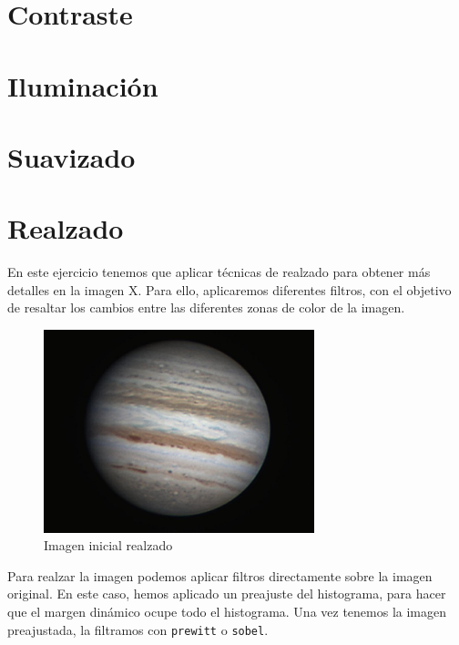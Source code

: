 \documentclass[12pt]{article}
\begin{document}
	\pagebreak
	
	\section{Contraste}
	
	\pagebreak
	
	\section{Iluminación}
	
	\pagebreak
	
	\section{Suavizado}
	
	\pagebreak
	
	\section{Realzado}
	
	\noindent En este ejercicio tenemos que aplicar técnicas de realzado para obtener más detalles en la imagen X. Para ello, aplicaremos diferentes filtros, con el objetivo de resaltar los cambios entre las diferentes zonas de color de la imagen.
	
	\begin{figure}[h]
		\begin{center}
			\includegraphics[width=0.7\textwidth]{img/realzado.jpg}
			\caption{Imagen inicial realzado}
			\label{img: realzado src}
		\end{center}
	\end{figure}

	\noindent Para realzar la imagen podemos aplicar filtros directamente sobre la imagen original. En este caso, hemos aplicado un preajuste del histograma, para hacer que el margen dinámico ocupe todo el histograma. Una vez tenemos la imagen preajustada, la filtramos con \texttt{prewitt} o \texttt{sobel}.
	
\end{document}
